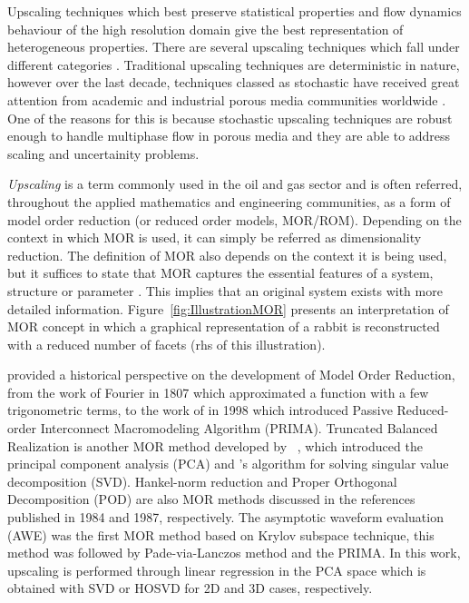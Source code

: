 \documentclass[preprint,12pt]{elsarticle}
\begin{document}
Upscaling techniques which best preserve statistical properties and flow dynamics behaviour of the high resolution domain give the best representation of heterogeneous properties. There are several upscaling techniques which fall under different categories \cite{Hasting_2001, Renard_1997, Szymkiewicz_2013}. Traditional upscaling techniques are deterministic in nature, however over the last decade, techniques classed as stochastic have received great attention from academic and industrial porous media communities worldwide \cite{Guilleminot_2012, Ravalec-Dupin_2010, Verwoerd_2009}. One of the reasons for this is because stochastic upscaling techniques are robust enough to handle multiphase flow in porous media and they are able to address scaling and uncertainity problems.

\medskip
{\it Upscaling} is a term commonly used in the oil and gas sector and is often referred, throughout the applied mathematics and engineering communities, as a form of model order reduction (or reduced order models, MOR/ROM). Depending on the context in which MOR is used, it can simply be referred as dimensionality reduction. The definition of MOR also depends on the context it is being used, but it suffices to state that MOR captures the essential features of a system, structure or parameter \cite{Schilders2008}. This implies that an original system exists with more detailed information. Figure~\ref{fig:IllustrationMOR} presents an interpretation of MOR concept in which a graphical representation of a rabbit is reconstructed with a reduced number of facets (rhs of this illustration).  

\citet{Schilders2008} provided a historical perspective on the development of Model Order Reduction, from the work of Fourier in 1807 which approximated a function with a few trigonometric terms, to the work of \citet{Odabasioglu_1998} in 1998 which introduced Passive Reduced-order Interconnect Macromodeling Algorithm (PRIMA). Truncated Balanced Realization  is another MOR method developed by \citeauthor{Moore_1981}~\cite{Moore_1981}, which introduced the principal component analysis (PCA) \cite{Hotelling_1933} and \citeauthor{Golub1970}'s \cite{Golub1970} algorithm for solving singular value decomposition (SVD). Hankel-norm reduction \cite{Glover_1984} and Proper Orthogonal Decomposition (POD) \cite{Sirovich_1987} are also MOR methods discussed in the references published in 1984 and 1987, respectively. The asymptotic waveform evaluation (AWE) \cite{Pillage_1990} was the first MOR method based on Krylov subspace technique, this method was followed by Pade-via-Lanczos method \cite{Feldmann_1995} and the PRIMA. In this work, upscaling is performed through linear regression in the PCA space which is obtained with SVD or HOSVD for 2D and 3D cases, respectively.
\end{document}
